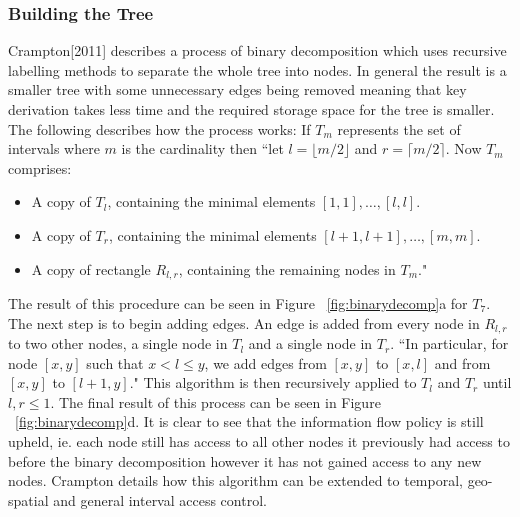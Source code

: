 \documentclass[10pt, titlepage]{article}
\begin{document}
\subsubsection{Building the Tree}
Crampton[2011]\cite{mainPaper} describes a process of binary decomposition which uses recursive labelling methods to separate the whole tree into nodes. In general the result is a smaller tree with some unnecessary edges being removed meaning that key derivation takes less time and the required storage space for the tree is smaller. The following describes how the process works:
\newline \indent If $T_{m}$ represents the set of intervals where $m$ is the cardinality then ``let $l = \lfloor m/2 \rfloor$ and $r = \lceil m/2 \rceil$. Now $T_{m}$ comprises:
\begin{itemize}
\item A copy of $T_{l}$, containing the minimal elements $[1, 1], \dots , [l,l]$.
\item A copy of $T_{r}$, containing the minimal elements $[l + 1, l + 1], \dots , [m, m]$.
\item A copy of rectangle $R_{l,r}$, containing the remaining nodes in $T_{m}$."
\end{itemize}
The result of this procedure can be seen in Figure ~\ref{fig:binarydecomp}a for $T_{7}$.
\newline The next step is to begin adding edges. An edge is added from every node in $R_{l,r}$ to two other nodes, a single node in $T_{l}$ and a single node in $T_{r}$. ``In particular, for node $[x, y]$ such that $x<l≤y$, we add edges from $[x, y]$ to $[x, l]$ and from $[x, y]$ to $[l + 1, y]$."
\newline This algorithm is then recursively applied to $T_{l}$ and $T_{r}$ until $l, r ≤ 1$. The final result of this process can be seen in Figure ~\ref{fig:binarydecomp}d.
\newline \indent It is clear to see that the information flow policy is still upheld, ie. each node still has access to all other nodes it previously had access to before the binary decomposition however it has not gained access to any new nodes.
\newline \indent Crampton details how this algorithm can be extended to temporal, geo-spatial and general interval access control.
\end{document}

